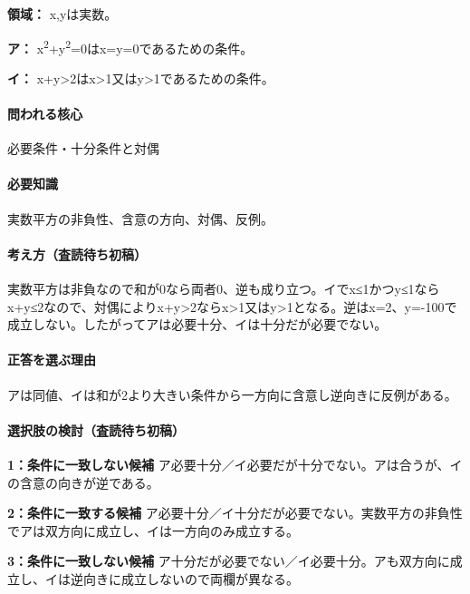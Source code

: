\noindent\textbf{領域：} x,yは実数。\par

\noindent\textbf{ア：} x\textsuperscript{2}+y\textsuperscript{2}=0はx=\allowbreak{}y=\allowbreak{}0であるための条件。\par

\noindent\textbf{イ：} x+y>2はx>1又はy>1であるための条件。\par

\paragraph{問われる核心} 必要条件・十分条件と対偶

\paragraph{必要知識} 実数平方の非負性、含意の方向、対偶、反例。

\paragraph{考え方（査読待ち初稿）} 実数平方は非負なので和が0なら両者0、逆も成り立つ。イでx≤1かつy≤1ならx+y≤2なので、対偶によりx+y>2ならx>1又はy>1となる。逆はx=\allowbreak{}2、y=-100で成立しない。したがってアは必要十分、イは十分だが必要でない。

\paragraph{正答を選ぶ理由} アは同値、イは和が2より大きい条件から一方向に含意し逆向きに反例がある。

\paragraph{選択肢の検討（査読待ち初稿）}\mbox{}\par

\noindent\textbf{1：条件に一致しない候補} ア必要十分／イ必要だが十分でない。アは合うが、イの含意の向きが逆である。\par

\noindent\textbf{2：条件に一致する候補} ア必要十分／イ十分だが必要でない。実数平方の非負性でアは双方向に成立し、イは一方向のみ成立する。\par

\noindent\textbf{3：条件に一致しない候補} ア十分だが必要でない／イ必要十分。アも双方向に成立し、イは逆向きに成立しないので両欄が異なる。\par

